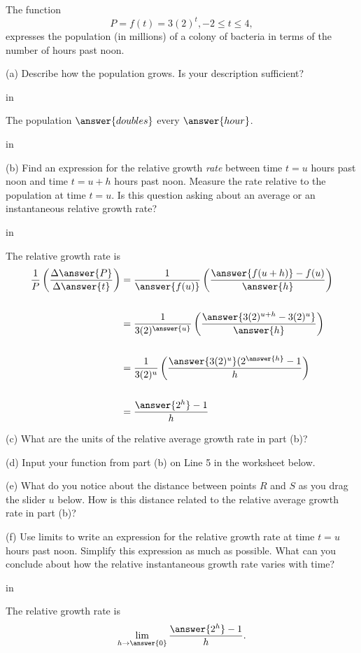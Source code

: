 \documentclass{ximera}
\newcommand{\pskip}{\vskip 0.1 in}
\begin{document}
\begin{question}  \label{Qdrg5h888}
The function 
\[
        P = f(t) = 3(2)^t , -2\leq t \leq 4 ,
\] 
expresses the population (in millions) of a colony of bacteria in terms of the number of hours past noon.

(a) Describe how the population grows. Is your description sufficient?

\pskip

The population $\answer{doubles}$ every $\answer{hour}$.

\pskip

(b) Find an expression for the relative growth \emph{rate} between time $t=u$ hours past noon and time $t=u+h$ hours past noon. Measure the rate relative to the population at time $t=u$. Is this question asking about an average or an instantaneous relative growth rate?

\pskip

The relative growth rate is
\begin{align*}
    \frac{1}{P} \left(  \frac{\Delta \answer{P}}{\Delta \answer{t}} \right)   &= \frac{1}{\answer{f(u)}} \left( \frac{\answer{f(u+h)} - f(u)}{\answer{h}}     \right)   \\ \\
                &= \frac{1}{3(2)^{\answer{u}}}   \left(   \frac{\answer{3(2)^{u+h}-3(2)^u}}{\answer{h}}     \right)  \\ \\
                &= \frac{1}{3(2)^u}   \left(   \frac{\answer{3(2)^u}(2^{\answer{h}}  -1}{h}  \right)  \\ \\
                &= \frac{\answer{2^h} - 1}{h}
\end{align*}

(c) What are the units of the relative average growth rate in part (b)?

(d) Input your function from part (b) on Line 5 in the worksheet below. 

(e) What do you notice about the distance between points $R$ and $S$ as you drag the slider $u$ below. How is this distance related to the relative average growth rate in part (b)?

(f) Use limits to write an expression for the relative growth rate at time $t=u$ hours past noon. Simplify this expression as much as possible.  What can you conclude about how the relative instantaneous growth rate varies with time?

\pskip

The relative growth rate is 
\[
    \lim_{h \to \answer{0}} \frac{\answer{2^h} - 1}{h} .
\]



\end{question}
\end{document}
